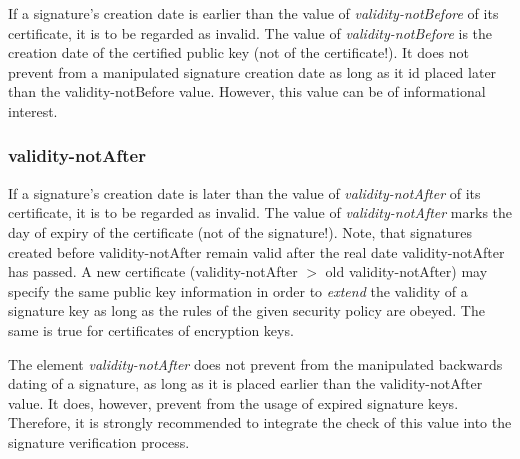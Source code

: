 If a signature's creation date is earlier than
the value of {\em validity-notBefore} of its certificate,
it is to be regarded as invalid.
The value of {\em validity-notBefore} is the creation date
of the certified public key (not of the certificate!).
It does not prevent from a manipulated signature creation date
as long as it id placed later than the validity-notBefore value.
However, this value can be of informational interest.

\subsubsection{validity-notAfter}
\label{sc-va}

If a signature's creation date is later than
the value of {\em validity-notAfter} of its certificate,
it is to be regarded as invalid.
The value of {\em validity-notAfter} marks the day
of expiry of the certificate (not of the signature!).
Note, that signatures created before validity-notAfter remain valid
after the real date validity-notAfter has passed.
A new certificate (validity-notAfter $>$ old validity-notAfter)
may specify the same public key information in order to {\em extend}
the validity of a signature key
as long as the rules of the given security policy are obeyed.
The same is true for certificates of encryption keys.

The element {\em validity-notAfter}
does not prevent from the manipulated backwards dating of a signature,
as long as it is placed earlier than the validity-notAfter value.
It does, however, prevent
from the usage of expired signature keys.
Therefore,
it is strongly recommended to integrate the check of this
value into the signature verification process.
